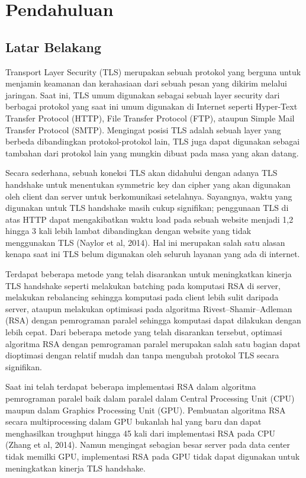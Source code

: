 \chapter{Pendahuluan}


\section{Latar Belakang}

Transport Layer Security (TLS) merupakan sebuah protokol yang berguna untuk menjamin keamanan dan kerahasiaan dari sebuah pesan yang dikirim melalui jaringan. Saat ini, TLS umum digunakan sebagai sebuah layer security dari berbagai protokol yang saat ini umum digunakan di Internet seperti Hyper-Text Transfer Protocol (HTTP), File Transfer Protocol (FTP), ataupun Simple Mail Transfer Protocol (SMTP). Mengingat posisi TLS adalah sebuah layer yang berbeda dibandingkan protokol-protokol lain, TLS juga dapat digunakan sebagai tambahan dari protokol lain yang mungkin dibuat pada masa yang akan datang.

Secara sederhana, sebuah koneksi TLS akan didahului dengan adanya TLS handshake untuk menentukan symmetric key dan cipher yang akan digunakan oleh client dan server untuk berkomunikasi setelahnya. Sayangnya, waktu yang digunakan untuk TLS handshake masih cukup signifikan; penggunaan TLS di atas HTTP dapat mengakibatkan waktu load pada sebuah website menjadi 1,2 hingga 3 kali lebih lambat dibandingkan dengan website yang tidak menggunakan TLS (Naylor et al, 2014). Hal ini merupakan salah satu alasan kenapa saat ini TLS belum digunakan oleh seluruh layanan yang ada di internet.

Terdapat beberapa metode yang telah disarankan untuk meningkatkan kinerja TLS handshake seperti melakukan batching pada komputasi RSA di server, melakukan rebalancing sehingga komputasi pada client lebih sulit daripada server, ataupun melakukan optimisasi pada algoritma Rivest–Shamir–Adleman (RSA) dengan pemrograman paralel sehingga komputasi dapat dilakukan dengan lebih cepat. Dari beberapa metode yang telah disarankan tersebut, optimasi algoritma RSA dengan pemrograman paralel merupakan salah satu bagian dapat dioptimasi dengan relatif mudah dan tanpa mengubah protokol TLS secara signifikan.

Saat ini telah terdapat beberapa implementasi RSA dalam algoritma pemrograman paralel baik dalam paralel dalam Central Processing Unit (CPU) maupun dalam Graphics Processing Unit (GPU). Pembuatan algoritma RSA secara multiprocessing dalam GPU bukanlah hal yang baru dan dapat menghasilkan troughput hingga 45 kali dari implementasi RSA pada CPU (Zhang et al, 2014). Namun mengingat sebagian besar server pada data center tidak memilki GPU, implementasi RSA pada GPU tidak dapat digunakan untuk meningkatkan kinerja TLS handshake.

